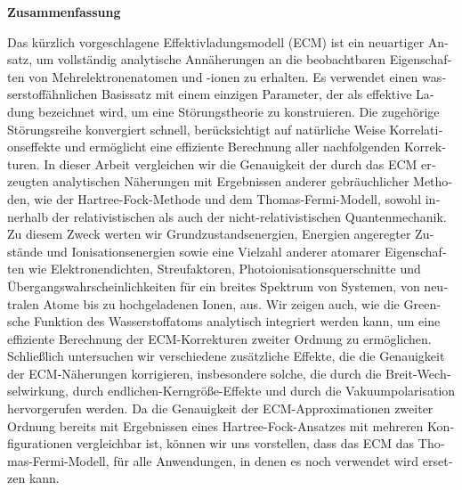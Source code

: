 \thispagestyle{empty}
\begin{otherlanguage}{ngerman}
{\small
  \begin{center}
    \textbf{Zusammenfassung}
  \end{center}

  \noindent Das k\"urzlich vorgeschlagene Effektivladungsmodell (ECM) ist ein neuartiger Ansatz, um vollst\"andig analytische Ann\"aherungen an die beobachtbaren Eigenschaften von Mehrelektronenatomen und -ionen zu erhalten. Es verwendet einen wasserstoff\"ahnlichen Basissatz mit einem einzigen Parameter, der als effektive Ladung bezeichnet wird, um eine St\"orungstheorie zu konstruieren. Die zugeh\"orige St\"orungsreihe konvergiert schnell, ber\"ucksichtigt auf nat\"urliche Weise Korrelationseffekte und erm\"oglicht eine effiziente Berechnung aller nachfolgenden Korrekturen. In dieser Arbeit vergleichen wir die Genauigkeit der durch das ECM erzeugten analytischen N\"aherungen mit Ergebnissen anderer gebr\"auchlicher Methoden, wie der Hartree-Fock-Methode und dem Thomas-Fermi-Modell, sowohl innerhalb der relativistischen als auch der nicht-relativistischen Quantenmechanik. Zu diesem Zweck werten wir Grundzustandsenergien, Energien angeregter Zust\"ande und Ionisationsenergien sowie eine Vielzahl anderer atomarer Eigenschaften wie Elektronendichten, Streufaktoren, Photoionisationsquerschnitte und \"Ubergangswahrscheinlichkeiten f\"ur ein breites Spektrum von Systemen,
von neutralen Atome bis zu hochgeladenen Ionen, aus. Wir zeigen auch, wie die Greensche Funktion des Wasserstoffatoms analytisch integriert werden kann, um eine effiziente Berechnung der ECM-Korrekturen zweiter Ordnung zu erm\"oglichen. Schlie\ss lich untersuchen wir verschiedene zus\"atzliche Effekte, die die Genauigkeit der ECM-N\"aherungen korrigieren, insbesondere solche, die durch die Breit-Wechselwirkung, durch endlichen-Kerngr\"o\ss e-Effekte und durch die Vakuumpolarisation hervorgerufen werden. Da die Genauigkeit der ECM-Approximationen zweiter Ordnung bereits mit Ergebnissen eines Hartree-Fock-Ansatzes mit mehreren Konfigurationen vergleichbar ist, k\"onnen wir uns vorstellen, dass das ECM das Thomas-Fermi-Modell, f\"ur alle Anwendungen, in denen es noch verwendet wird ersetzen kann.} %
\end{otherlanguage}

